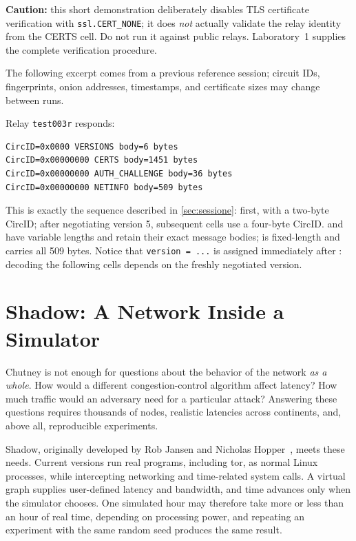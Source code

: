 \textbf{Caution:} this short demonstration deliberately disables TLS certificate verification with \texttt{ssl.CERT\_NONE}; it does \emph{not} actually validate the relay identity from the CERTS cell. Do not run it against public relays. Laboratory~1 supplies the complete verification procedure.

The following excerpt comes from a previous reference session; circuit IDs, fingerprints, onion addresses, timestamps, and certificate sizes may change between runs.

Relay \texttt{test003r} responds:
\begin{lstlisting}[numbers=none]
CircID=0x0000 VERSIONS body=6 bytes
CircID=0x00000000 CERTS body=1451 bytes
CircID=0x00000000 AUTH_CHALLENGE body=36 bytes
CircID=0x00000000 NETINFO body=509 bytes
\end{lstlisting}

This is exactly the sequence described in \cref{sec:sessione}: first,  with a two-byte CircID; after negotiating version 5, subsequent cells use a four-byte CircID.  and  have variable lengths and retain their exact message bodies;  is fixed-length and carries all 509 bytes. Notice that \texttt{version = ...} is assigned immediately after : decoding the following cells depends on the freshly negotiated version.

\section{Shadow: A Network Inside a Simulator}\label{sec:rp-shadow}

Chutney is not enough for questions about the behavior of the network \emph{as a whole}. How would a different congestion-control algorithm affect latency? How much traffic would an adversary need for a particular attack? Answering these questions requires thousands of nodes, realistic latencies across continents, and, above all, reproducible experiments.

Shadow, originally developed by Rob Jansen and Nicholas Hopper~\cite{jansen2012shadow}, meets these needs. Current versions run real programs, including tor, as normal Linux processes, while intercepting networking and time-related system calls. A virtual graph supplies user-defined latency and bandwidth, and time advances only when the simulator chooses. One simulated hour may therefore take more or less than an hour of real time, depending on processing power, and repeating an experiment with the same random seed produces the same result.


